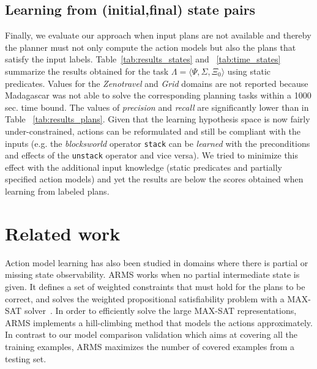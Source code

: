\documentclass[letterpaper]{article} %
\newcommand{\tup}[1]{{\langle #1 \rangle}}
\newcommand{\strips}{\textsc{Strips}}     %
\begin{document}
\subsection{Learning from (initial,final) state pairs}
Finally, we evaluate our approach when input plans are not available and thereby the planner must not only compute the action models but also the plans that satisfy the input labels. Table~\ref{tab:results_states} and ~\ref{tab:time_states} summarize the results obtained for the task $\Lambda=\tup{\Psi,\Sigma,\Xi_0}$ using static predicates. Values for the {\em Zenotravel} and {\em Grid} domains are not reported because {\sc Madagascar} was not able to solve the corresponding planning tasks within a 1000 sec. time bound. The values of \emph{precision} and \emph{recall} are significantly lower than in Table ~\ref{tab:results_plans}. Given that the learning hypothesis space is now fairly under-constrained, actions can be reformulated and still be compliant with the inputs (e.g. the {\em blocksworld} operator {\small\tt stack} can be {\em learned} with the preconditions and effects of the {\small\tt unstack} operator and vice versa). We tried to minimize this effect with the additional input knowledge (static predicates and partially specified action models) and yet the results are below the scores obtained when learning from labeled plans.


\section{Related work}



Action model learning has also been studied in domains where there is partial or missing state observability. {\sf ARMS} works when no partial intermediate state is given. It defines a set of weighted constraints that must hold for the plans to be correct, and solves the weighted propositional satisfiability problem with a MAX-SAT solver~\cite{yang2007learning}. In order to efficiently solve the large MAX-SAT representations, {\sf ARMS} implements a hill-climbing method that models the actions approximately. In contrast to our model comparison validation which aims at covering all the training examples, ARMS maximizes the number of covered examples from a testing set.
\end{document}
